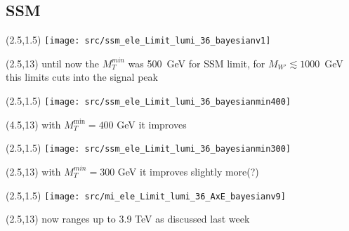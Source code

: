 
\subsection{SSM}
\begin{frame}
        \begin{textblock}{11}(2.5,1.5) %
            \texttt{[image: src/ssm\_ele\_Limit\_lumi\_36\_bayesianv1]}
        \end{textblock}
        \begin{textblock}{11}(2.5,13) %
        until now the $M_T^{min}$ was 500~GeV for SSM limit, for $M_{W'}\lesssim1000$~GeV this limits cuts into the signal peak
        \end{textblock}
\end{frame}
\begin{frame}
        \begin{textblock}{11}(2.5,1.5) %
            \texttt{[image: src/ssm\_ele\_Limit\_lumi\_36\_bayesianmin400]}
        \end{textblock}
        \begin{textblock}{11}(4.5,13) %
        with $M_T^{\mathrm{min}}=400$ GeV it improves
        \end{textblock}
\end{frame}
\begin{frame}
        \begin{textblock}{11}(2.5,1.5) %
            \texttt{[image: src/ssm\_ele\_Limit\_lumi\_36\_bayesianmin300]}
        \end{textblock}
        \begin{textblock}{11}(2.5,13) %
        with $M_T^{min}=300$ GeV it improves slightly more(?)
        \end{textblock}
\end{frame}
\begin{frame}
        \begin{textblock}{11}(2.5,1.5) %
            \texttt{[image: src/mi\_ele\_Limit\_lumi\_36\_AxE\_bayesianv9]}
        \end{textblock}
        \begin{textblock}{11}(2.5,13) %
            now ranges up to 3.9 TeV as discussed last week
        \end{textblock}
\end{frame}
